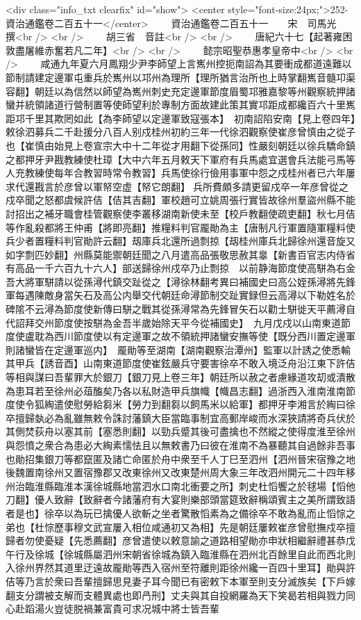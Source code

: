 <div class="info_txt clearfix" id="show">
<center style="font-size:24px;">252-資治通鑑卷二百五十一</center>
  　　資治通鑑卷二百五十一　　宋　司馬光　撰<br />
<br />
　　胡三省　音註<br />
<br />
　　唐紀六十七【起著雍困敦盡屠維赤奮若凡二年】<br />
<br />
　　懿宗昭聖恭惠孝皇帝中<br />
<br />
　　咸通九年夏六月鳳翔少尹李師望上言嶲州控扼南詔為其要衝成都道遠難以節制請建定邊軍屯重兵於嶲州以邛州為理所【理所猶言治所也上時掌翻嶲音髓卭渠容翻】朝廷以為信然以師望為嶲州刺史充定邊軍節度眉蜀邛雅嘉黎等州觀察統押諸蠻并統領諸道行營制置等使師望利於專制方面故建此策其實邛距成都纔百六十里嶲距邛千里其欺罔如此【為李師望以定邊軍致寇張本】　初南詔陷安南【見上卷四年】敕徐泗募兵二千赴援分八百人别戍桂州初約三年一代徐泗觀察使崔彦曾慎由之從子也【崔慎由始見上卷宣宗大中十二年從才用翻下從孫同】性嚴刻朝廷以徐兵驕命鎮之都押牙尹戡教練使杜璋【大中六年五月敕天下軍府有兵馬處宜選會兵法能弓馬等人充教練使每年合教習時常令教習】兵馬使徐行儉用事軍中怨之戍桂州者已六年屢求代還戡言於彦曾以軍帑空虚【帑它朗翻】兵所費頗多請更留戍卒一年彦曾從之戍卒聞之怒都虞候許佶【佶其吉翻】軍校趙可立姚周張行實皆故徐州羣盜州縣不能討招出之補牙職會桂管觀察使李叢移湖南新使未至【校戶教翻使疏吏翻】秋七月佶等作亂殺都將王仲甫【將即亮翻】推糧料判官龎勛為主【唐制凡行軍置隨軍糧料使兵少者置糧料判官勛許云翻】刼庫兵北還所過剽掠【刼桂州庫兵北歸徐州還音旋又如字剽匹妙翻】州縣莫能禦朝廷聞之八月遣高品張敬思赦其辠【新書百官志内侍省有高品一千六百九十六人】部送歸徐州戍卒乃止剽掠　以前静海節度使高駢為右金吾大將軍駢請以從孫潯代鎮交趾從之【潯徐林翻考異曰補國史曰高公姪孫潯將先鋒軍每遇陳敵身當矢石及高公内舉交代朝廷命潯節制交趾實録但云高潯以下勒姓名於碑隂不云潯為節度使新傳曰駢之戰其從孫潯常為先鋒冒矢石以勸士駢徙天平薦潯自代詔拜交州節度使按駢為金吾半歲始除天平今從補國史】　九月戊戍以山南東道節度使盧耽為西川節度使以有定邊軍之故不領統押諸蠻安撫等使【既分西川置定邊軍則諸蠻皆在定邊軍巡内】　龎勛等至湖南【湖南觀察治潭州】監軍以計誘之使悉輸其甲兵【誘音酉】山南東道節度使崔鉉嚴兵守要害徐卒不敢入境泛舟沿江東下許佶等相與謀曰吾輩罪大於銀刀【銀刀見上卷三年】朝廷所以赦之者慮緣道攻刧或潰散為患耳若至徐州必葅醢矣乃各以私財造甲兵旗幟【幟昌志翻】過浙西入淮南淮南節度使令狐綯遣使慰勞給芻米【勞力到翻芻以飼馬米以給軍】都押牙李湘言於綯曰徐卒擅歸埶必為亂雖無敕令誅討藩鎮大臣當臨事制宜高郵岸峻而水深狹請將奇兵伏於其側焚荻舟以塞其前【塞悉則翻】以勁兵蹙其後可盡擒也不然縱之使得度淮至徐州與怨憤之衆合為患必大綯素懦怯且以無敕書乃曰彼在淮南不為暴聽其自過餘非吾事也勛招集銀刀等都竄匿及諸亡命匿於舟中衆至千人丁巳至泗州【泗州晉宋宿豫之地後魏置南徐州又置宿豫郡又改東徐州又改東楚州周大象三年改泗州開元二十四年移州治臨淮縣臨淮本漢徐城縣地當泗水口南北衝要之所】刺史杜慆饗之於毬場【慆他刀翻】優人致辭【致辭者今諸藩府有大宴則樂部頭當筵致辭稱頌賓主之美所謂致語者是也】徐卒以為玩已擒優人欲斬之坐者驚散慆素為之備徐卒不敢為亂而止慆悰之弟也【杜悰歷事穆文武宣屢入相位咸通初又為相】先是朝廷屢敕崔彦曾慰撫戍卒擅歸者勿使憂疑【先悉薦翻】彦曾遣使以敕意諭之道路相望勛亦申狀相繼辭禮甚恭戊午行及徐城【徐城縣屬泗州宋朝省徐城為鎮入臨淮縣在泗州北百餘里自此而西北則入徐州界然其道里迂遠故龎勛等西入宿州至符離則距徐州纔一百四十里耳】勛與許佶等乃言於衆曰吾輩擅歸思見妻子耳今聞已有密敕下本軍至則支分滅族矣【下戶嫁翻支分謂被支解而支體異處也即冎刑】丈夫與其自投網羅為天下笑曷若相與戮力同心赴蹈湯火豈徒脱禍兼富貴可求况城中將士皆吾輩